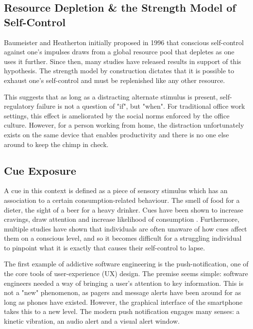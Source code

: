 \subsection{Resource Depletion \& the Strength Model of Self-Control}
Baumeister and Heatherton \cite{baumeister1996self} initially proposed in 1996 that conscious self-control against one's impulses draws from a global resource pool that depletes as one uses it further. Since then, many studies have released results in support of this hypothesis. The strength model by construction dictates that it is possible to exhaust one's self-control and must be replenished like any other resource.

This suggests that as long as a distracting alternate stimulus is present, self-regulatory failure is not a question of "if", but "when". For traditional office work settings, this effect is ameliorated by the social norms enforced by the office culture. However, for a person working from home, the distraction unfortunately exists on the same device that enables productivity and there is no one else around to keep the chimp in check.

\subsection{Cue Exposure}
A cue in this context is defined as a piece of sensory stimulus which has an association to a certain consumption-related behaviour. The smell of food for a dieter, the sight of a beer for a heavy drinker. Cues have been shown to increase cravings, draw attention and increase likelihood of consumption \cite{jansen1998learning}. Furthermore, multiple studies have shown that individuals are often unaware of how cues affect them on a conscious level\cite{stacy2010implicit}, and so it becomes difficult for a struggling individual to pinpoint what it is exactly that causes their self-control to lapse.

The first example of addictive software engineering is the push-notification, one of the core tools of user-experience (UX) design. The premise seems simple: software engineers needed a way of bringing a user's attention to key information. This is not a "new" phenomenon, as pagers and message alerts have been around for as long as phones have existed. However, the graphical interface of the smartphone takes this to a new level. The modern push notification engages many senses: a kinetic vibration, an audio alert and a visual alert window.

